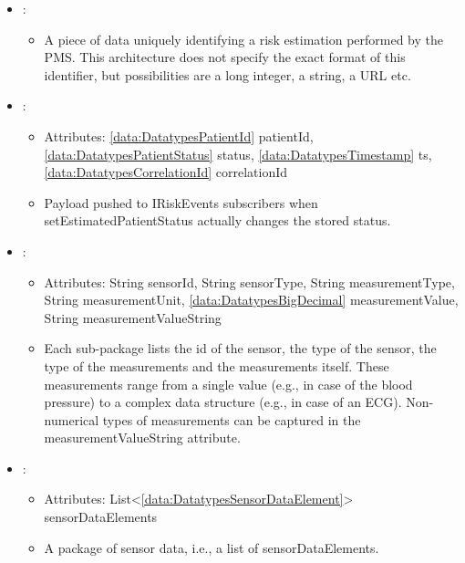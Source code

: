 \begin{itemize}[nolistsep,noitemsep]
\item {}: 
\begin{itemize}[noitemsep,nolistsep]

\item[] A piece of data uniquely identifying a risk estimation performed by the PMS. This architecture does not specify the exact format of this identifier,
but possibilities are a long integer, a string, a URL etc.
\end{itemize}

\item {}: 
\begin{itemize}[noitemsep,nolistsep]
\item[] Attributes: \ref{data:DatatypesPatientId} patientId, \ref{data:DatatypesPatientStatus} status, \ref{data:DatatypesTimestamp} ts, \ref{data:DatatypesCorrelationId} correlationId
\item[] Payload pushed to IRiskEvents subscribers when setEstimatedPatientStatus actually changes the stored status.
\end{itemize}

\item {}: 
\begin{itemize}[noitemsep,nolistsep]
\item[] Attributes: String sensorId, String sensorType, String measurementType, String measurementUnit, \ref{data:DatatypesBigDecimal} measurementValue, String measurementValueString
\item[] Each sub-package lists the id of the sensor, the type of the sensor, the
type of the measurements and the measurements itself. These
measurements range from a single value (e.g., in case of the blood
pressure) to a complex data structure (e.g., in case of an ECG).
Non-numerical types of measurements can be captured in the measurementValueString attribute.
\end{itemize}

\item {}: 
\begin{itemize}[noitemsep,nolistsep]
\item[] Attributes: List\textless{}\ref{data:DatatypesSensorDataElement}\textgreater{} sensorDataElements
\item[] A package of sensor data, i.e., a list of sensorDataElements.


\end{itemize}
\end{itemize}
